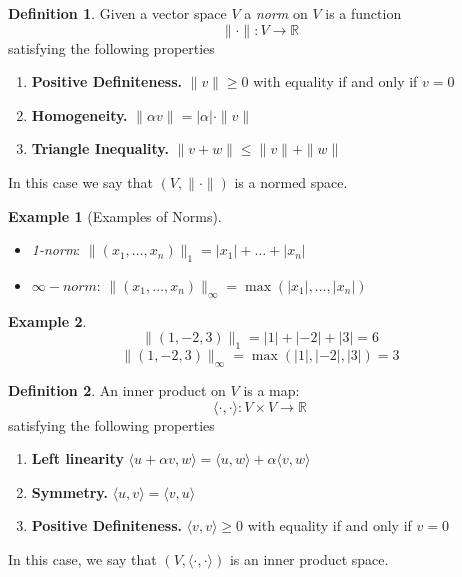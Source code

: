 \documentclass[11pt,openany]{book}
\theoremstyle{plain}
\theoremstyle{definition}
\newtheorem{definition}{Definition}[chapter]
\newtheorem{example}{Example}[chapter]
\theoremstyle{remark}
\newcommand{\R}{\mathbb{R}}
\begin{document}
\begin{definition}
    Given a vector space $V$ a \emph{norm} on $V$ is a function \[\|\cdot\| : V \to \R\] satisfying the following properties
    \begin{enumerate}
        \item {\bf Positive Definiteness.} $\|v\| \ge 0$ with equality if and only if $v=0$
        \item {\bf Homogeneity. }$\|\alpha v\| = |\alpha|\cdot \|v\|$
        \item {\bf Triangle Inequality. } $\|v+w\| \le \|v\|+\|w\|$
    \end{enumerate}
In this case we say that $(V,\|\cdot\|)$ is a normed space.
\end{definition}
\begin{example}[Examples of Norms]
    \begin{itemize}
        \item \emph{1-norm}: $\|(x_1,\dots, x_n)\|_1 = |x_1|+\dots +|x_n|$
        \item $\infty-norm$: $\|(x_1, \dots, x_n)\|_{\infty} = \max(|x_1|, \dots, |x_n|)$
    \end{itemize}
\end{example}
\begin{example}
    \[
    \|(1, -2, 3)\|_1 = |1|+|-2|+|3| = 6
    \]
    \[
    \|(1, -2, 3)\|_{\infty} = \max(|1|,|-2|,|3|) = 3
    \]
\end{example}
\begin{definition}
    An inner product on $V$ is a map:
    \[
    \langle \cdot , \cdot \rangle : V \times V \to \R
    \]
    satisfying the following properties
    \begin{enumerate}
        \item {\bf Left linearity} $\langle u+\alpha v, w \rangle = \langle u, w \rangle + \alpha \langle v, w \rangle $
        \item {\bf Symmetry.} $\langle u,v \rangle = \langle v, u \rangle$
        \item {\bf Positive Definiteness.} $\langle v,v \rangle \ge 0$ with equality if and only if $v = 0$
    \end{enumerate}
In this case, we say that $(V,\langle \cdot,\cdot\rangle)$ is an inner product space.
\end{definition}
\end{document}
